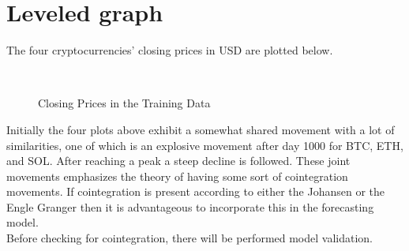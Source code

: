 \section{Leveled graph}
The four cryptocurrencies' closing prices in USD are plotted below.
\begin{figure}[H]
  \centering
  \quad
  \\
  \quad
  \caption{Closing Prices in the Training Data}
  \label{graph_in _levels}
\end{figure}
\noindent Initially the four plots above exhibit a somewhat shared movement with a lot of similarities, one of which is an explosive movement after day 1000 for BTC, ETH, and SOL. After reaching a peak a steep decline is followed. These joint movements emphasizes the theory of having some sort of cointegration movements. If cointegration is present according to either the Johansen or the Engle Granger then it is advantageous to incorporate this in the forecasting model.\\
Before checking for cointegration, there will be performed model validation.


